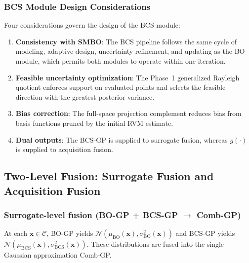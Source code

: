 \documentclass[lettersize,journal]{IEEEtran}
\begin{document}
\subsubsection{BCS Module Design Considerations}
Four considerations govern the design of the BCS module:
\begin{enumerate}
    \item \textbf{Consistency with SMBO}: The BCS pipeline follows the same cycle of modeling, adaptive design, uncertainty refinement, and updating as the BO module, which permits both modules to operate within one iteration.
    \item \textbf{Feasible uncertainty optimization}: The Phase~1 generalized Rayleigh quotient enforces support on evaluated points and selects the feasible direction with the greatest posterior variance.
    \item \textbf{Bias correction}: The full-space projection complement reduces bias from basis functions pruned by the initial RVM estimate.
    \item \textbf{Dual outputs}: The BCS-GP is supplied to surrogate fusion, whereas $g(\cdot)$ is supplied to acquisition fusion.
\end{enumerate}

\subsection{Two-Level Fusion: Surrogate Fusion and Acquisition Fusion}
\label{subsec:fusion}

\subsubsection{Surrogate-level fusion (BO-GP + BCS-GP $\rightarrow$ Comb-GP)}
\label{subsubsec:sur_fusion}

At each $\mathbf{x}\in\mathcal{C}$, BO-GP yields $\mathcal{N}(\mu_{\mathrm{BO}}(\mathbf{x}),\sigma_{\mathrm{BO}}^2(\mathbf{x}))$ and BCS-GP yields $\mathcal{N}(\mu_{\mathrm{BCS}}(\mathbf{x}),\sigma_{\mathrm{BCS}}^2(\mathbf{x}))$. These distributions are fused into the single Gaussian approximation Comb-GP.
\end{document}
